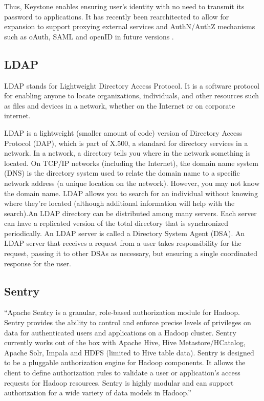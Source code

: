      Thus, Keystone enables ensuring user’s identity with no need to
     transmit its password to applications. It has recently been
     rearchitected to allow for expansion to support proxying external
     services and AuthN/AuthZ mechanisms such as oAuth, SAML and
     openID in future versions \cite{www-keystone}.

\subsection{ LDAP}

     LDAP stands for Lightweight Directory Access Protocol. It is a software
     protocol for enabling anyone to locate organizations, individuals, and
     other resources such as files and devices in a network, whether on the
     Internet or on corporate internet.
     \cite{www-ldap}

     LDAP is a lightweight (smaller amount of code) version of
     Directory Access Protocol (DAP), which is part of X.500, a
     standard for directory services in a network.  In a network, a
     directory tells you where in the network something is located. On
     TCP/IP networks (including the Internet), the domain name system
     (DNS) is the directory system used to relate the domain name to a
     specific network address (a unique location on the
     network). However, you may not know the domain name. LDAP allows
     you to search for an individual without knowing where they're
     located (although additional information will help with the
     search).An LDAP directory can be distributed among many
     servers. Each server can have a replicated version of the total
     directory that is synchronized periodically.  An LDAP server is
     called a Directory System Agent (DSA). An LDAP server that
     receives a request from a user takes responsibility for the
     request, passing it to other DSAs as necessary, but ensuring a
     single coordinated response for the user.

\subsection{ Sentry}

     ``Apache Sentry \cite{www-sentry}  is a granular, role-based authorization 
     module for Hadoop. Sentry provides the ability to control and enforce 
     precise levels of privileges on data for authenticated users and 
     applications on a Hadoop cluster. Sentry currently works out of the box 
     with Apache Hive, Hive Metastore/HCatalog, Apache Solr, Impala and HDFS 
     (limited to Hive table data). Sentry is designed to be a pluggable 
     authorization engine for Hadoop components. It allows the client to define 
     authorization rules to validate a user or application’s access requests 
     for Hadoop resources. Sentry is highly modular and can support authorization 
     for a wide variety of data models in Hadoop.''

